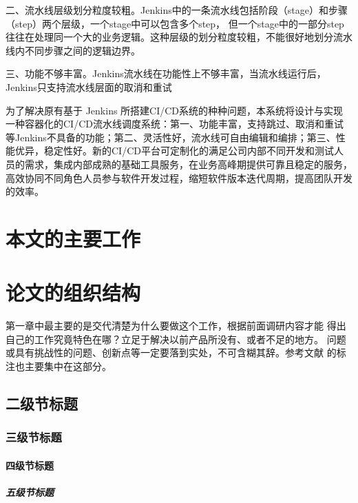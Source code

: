 二、流水线层级划分粒度较粗。Jenkins中的一条流水线包括阶段（stage）和步骤（step）两个层级，一个stage中可以包含多个step，
但一个stage中的一部分step往往在处理同一个大的业务逻辑。这种层级的划分粒度较粗，不能很好地划分流水线内不同步骤之间的逻辑边界。

三、功能不够丰富。Jenkins流水线在功能性上不够丰富，当流水线运行后，Jenkins只支持流水线层面的取消和重试

为了解决原有基于 Jenkins 所搭建CI/CD系统的种种问题，本系统将设计与实现一种容器化的CI/CD流水线调度系统：第一、功能丰富，支持跳过、取消和重试等Jenkins不具备的功能；第二、灵活性好，流水线可自由编辑和编排；第三、性能优异，稳定性好。新的CI/CD平台可定制化的满足公司内部不同开发和测试人员的需求，集成内部成熟的基础工具服务，在业务高峰期提供可靠且稳定的服务，高效协同不同角色人员参与软件开发过程，缩短软件版本迭代周期，提高团队开发的效率。


\section{本文的主要工作}

\section{论文的组织结构}
第一章中最主要的是交代清楚为什么要做这个工作，根据前面调研内容才能
得出自己的工作究竟特色在哪？立足于解决以前产品所没有、或者不足的地方。
问题或具有挑战性的问题、创新点等一定要落到实处，不可含糊其辞。参考文献
的标注也主要集中在这部分。


\subsection{二级节标题}

\subsubsection{三级节标题}

\paragraph{四级节标题}

\subparagraph{五级节标题}
